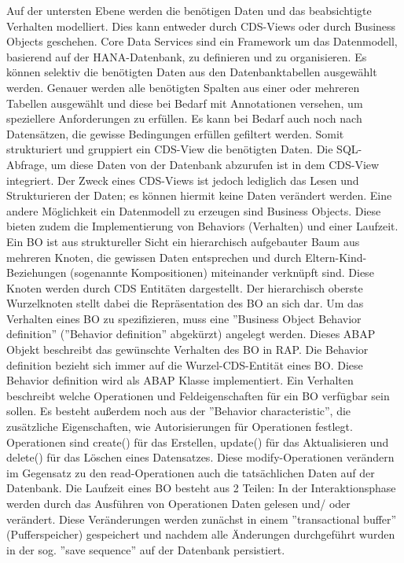 Auf der untersten Ebene werden die benötigen Daten und das beabsichtigte Verhalten modelliert. Dies kann entweder durch CDS-Views oder durch Business Objects geschehen. Core Data Services sind ein Framework um das Datenmodell, basierend auf der HANA-Datenbank, zu definieren und zu organisieren. Es können selektiv die benötigten Daten aus den Datenbanktabellen ausgewählt werden. Genauer werden alle benötigten Spalten aus einer oder mehreren Tabellen ausgewählt und diese bei Bedarf  mit Annotationen versehen, um speziellere Anforderungen zu erfüllen. Es kann bei Bedarf auch noch nach Datensätzen, die gewisse Bedingungen erfüllen gefiltert werden. Somit strukturiert und gruppiert ein CDS-View die benötigten Daten. Die SQL-Abfrage, um diese Daten von der Datenbank abzurufen ist in dem CDS-View integriert. Der Zweck eines CDS-Views ist jedoch lediglich das Lesen und Strukturieren der Daten; es können hiermit keine Daten verändert werden. Eine andere Möglichkeit ein Datenmodell zu erzeugen sind Business Objects. Diese bieten zudem die Implementierung von Behaviors (Verhalten) und einer Laufzeit. Ein BO ist aus struktureller Sicht ein hierarchisch aufgebauter Baum aus mehreren Knoten, die gewissen Daten entsprechen und durch Eltern-Kind-Beziehungen (sogenannte Kompositionen) miteinander verknüpft sind. Diese Knoten werden durch CDS Entitäten dargestellt. Der hierarchisch oberste Wurzelknoten stellt dabei die Repräsentation des BO an sich dar. Um das Verhalten eines BO zu spezifizieren, muss eine ''Business Object Behavior definition'' (''Behavior definition'' abgekürzt) angelegt werden. Dieses ABAP Objekt beschreibt das gewünschte Verhalten des BO in RAP. Die Behavior definition bezieht sich immer auf die Wurzel-CDS-Entität eines BO. Diese Behavior definition wird als ABAP Klasse implementiert. Ein Verhalten beschreibt welche Operationen und Feldeigenschaften für ein BO verfügbar sein sollen. Es besteht außerdem noch aus der ''Behavior characteristic'', die zusätzliche Eigenschaften, wie \zB Autorisierungen für Operationen festlegt. Operationen sind \zB create() für das Erstellen, update() für das Aktualisieren und delete() für das Löschen eines Datensatzes. Diese modify-Operationen verändern im Gegensatz zu den read-Operationen auch die tatsächlichen Daten auf der Datenbank. Die Laufzeit eines BO besteht aus 2 Teilen: In der Interaktionsphase werden durch das Ausführen von Operationen Daten gelesen und/ oder verändert. Diese Veränderungen werden zunächst in einem ''transactional buffer'' (Pufferspeicher) gespeichert und nachdem alle Änderungen durchgeführt wurden in der sog. ''save sequence'' auf der Datenbank persistiert.

